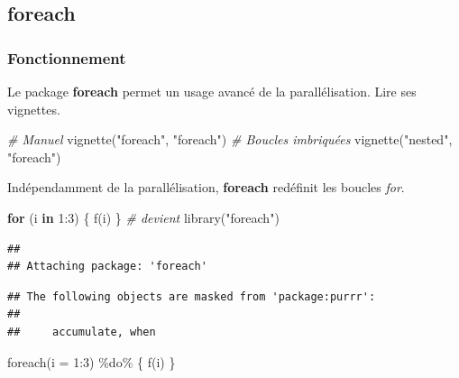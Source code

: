 \documentclass[
  11pt,
  french,
  a4paper,
  extrafontsizes,onecolumn,openright
  ]{memoir}
\newenvironment{Shaded}{\begin{snugshade}}{\end{snugshade}}
\newcommand{\AttributeTok}[1]{\textcolor[rgb]{0.77,0.63,0.00}{#1}}
\newcommand{\CommentTok}[1]{\textcolor[rgb]{0.56,0.35,0.01}{\textit{#1}}}
\newcommand{\ControlFlowTok}[1]{\textcolor[rgb]{0.13,0.29,0.53}{\textbf{#1}}}
\newcommand{\DecValTok}[1]{\textcolor[rgb]{0.00,0.00,0.81}{#1}}
\newcommand{\FunctionTok}[1]{\textcolor[rgb]{0.00,0.00,0.00}{#1}}
\newcommand{\NormalTok}[1]{#1}
\newcommand{\SpecialCharTok}[1]{\textcolor[rgb]{0.00,0.00,0.00}{#1}}
\newcommand{\StringTok}[1]{\textcolor[rgb]{0.31,0.60,0.02}{#1}}
\begin{document}
\hypertarget{foreach}{%
\subsection{foreach}\label{foreach}}

\hypertarget{fonctionnement}{%
\subsubsection{Fonctionnement}\label{fonctionnement}}

Le package \textbf{foreach} permet un usage avancé de la parallélisation.
Lire ses vignettes.

\scriptsize

\begin{Shaded}
\begin{Highlighting}[]
\CommentTok{\# Manuel}
\FunctionTok{vignette}\NormalTok{(}\StringTok{"foreach"}\NormalTok{, }\StringTok{"foreach"}\NormalTok{)}
\CommentTok{\# Boucles imbriquées}
\FunctionTok{vignette}\NormalTok{(}\StringTok{"nested"}\NormalTok{, }\StringTok{"foreach"}\NormalTok{)}
\end{Highlighting}
\end{Shaded}

\normalsize

Indépendamment de la parallélisation, \textbf{foreach} redéfinit les boucles \emph{for}.

\scriptsize

\begin{Shaded}
\begin{Highlighting}[]
\ControlFlowTok{for}\NormalTok{ (i }\ControlFlowTok{in} \DecValTok{1}\SpecialCharTok{:}\DecValTok{3}\NormalTok{) \{}
    \FunctionTok{f}\NormalTok{(i)}
\NormalTok{\}}
\CommentTok{\# devient}
\FunctionTok{library}\NormalTok{(}\StringTok{"foreach"}\NormalTok{)}
\end{Highlighting}
\end{Shaded}

\begin{verbatim}
## 
## Attaching package: 'foreach'
\end{verbatim}

\begin{verbatim}
## The following objects are masked from 'package:purrr':
## 
##     accumulate, when
\end{verbatim}

\begin{Shaded}
\begin{Highlighting}[]
\FunctionTok{foreach}\NormalTok{(}\AttributeTok{i =} \DecValTok{1}\SpecialCharTok{:}\DecValTok{3}\NormalTok{) }\SpecialCharTok{\%do\%}\NormalTok{ \{}
    \FunctionTok{f}\NormalTok{(i)}
\NormalTok{\}}
\end{Highlighting}
\end{Shaded}
\end{document}
